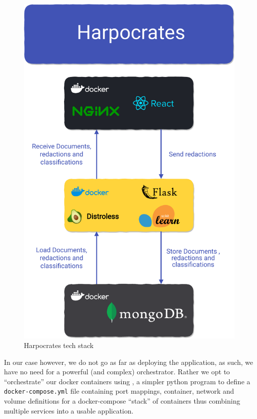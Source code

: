 \documentclass[\version]{l4proj}
\begin{document}
\begin{figure}
    \includegraphics[width=\linewidth]{figures/tech_stack_no_background.pdf}
    \caption{Harpocrates tech stack}\label{fig:tech_stack}
    \vspace{-10pt}
\end{figure}

In our case however, we do not go as far as deploying the application, as such, we have no need for a powerful (and complex) orchestrator.
Rather we opt to ``orchestrate'' our docker containers using \textcite{DockerCompose2020}, a simpler python program to define a \verb|docker-compose.yml| file containing port mappings, container, network and volume definitions for a docker-compose ``stack'' of containers thus combining multiple services into a usable application.
\end{document}
